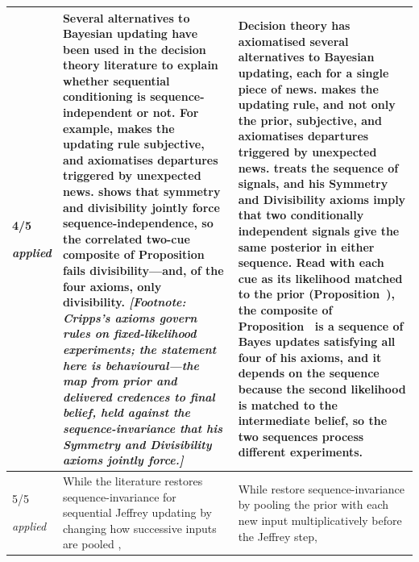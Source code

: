 \documentclass[10pt]{article}
\theoremstyle{definition}
\renewcommand{\ref}[1]{\textsc{\detokenize{#1}}}
\renewcommand{\footnote}[1]{ \textit{[Footnote: #1]}}
\begin{document}
{\begin{longtable}{|p{0.9cm}|p{12.2cm}|p{12.2cm}|}
4/5 \par{\tiny\textit{applied}} & \textbf{Several alternatives to Bayesian updating have been used in the decision theory literature to explain whether sequential conditioning is sequence-independent or not}. For example, \citet{Epstein2006} makes the updating rule subjective, and \citet{Ortoleva2012} axiomatises departures triggered by unexpected news. \citet{Cripps2021} shows that symmetry and divisibility jointly force sequence-independence, so the correlated two-cue composite of Proposition~\ref{prop:DIV} fails divisibility---and, of the four axioms, only divisibility.\footnote{Cripps's axioms govern rules on fixed-likelihood experiments; the statement here is behavioural---the map from prior and delivered credences to final belief, held against the sequence-invariance that his Symmetry and Divisibility axioms jointly force.} & Decision theory has axiomatised several alternatives to Bayesian updating, each for a single piece of news. \citet{Epstein2006} makes the updating rule, and not only the prior, subjective, and \citet{Ortoleva2012} axiomatises departures triggered by unexpected news. \citet{Cripps2021} treats the sequence of signals, and his Symmetry and Divisibility axioms imply that two conditionally independent signals give the same posterior in either sequence. Read with each cue as its likelihood matched to the prior (Proposition~\ref{prop:IMM}), the composite of Proposition~\ref{prop:DIV} is a sequence of Bayes updates satisfying all four of his axioms, and it depends on the sequence because the second likelihood is matched to the intermediate belief, so the two sequences process different experiments. \\ \hline
5/5 \par{\tiny\textit{applied}} & While the literature restores sequence-invariance for sequential Jeffrey updating by changing how successive inputs are pooled \citep{PettigrewWeisberg2025}, & While \citet{PettigrewWeisberg2025} restore sequence-invariance by pooling the prior with each new input multiplicatively before the Jeffrey step, \\ \hline

\end{longtable}}
\end{document}
